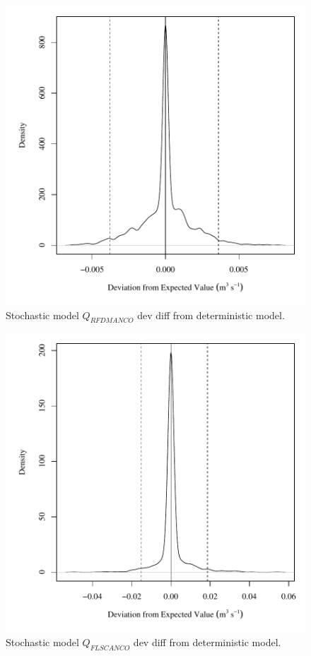 \begin{center}
\begin{figure}[htbp]
	\includegraphics[width=6in]{"Figures/Results_USR/V dev diff qRFD"}
	\caption{Stochastic model $Q_{RFDMANCO}$ dev diff from deterministic model.}
\end{figure}
\end{center}
\newpage

\begin{center}
\begin{figure}[htbp]
	\includegraphics[width=6in]{"Figures/Results_USR/V dev diff qFLS"}
	\caption{Stochastic model $Q_{FLSCANCO}$ dev diff from deterministic model.}
\end{figure}
\end{center}
\newpage

